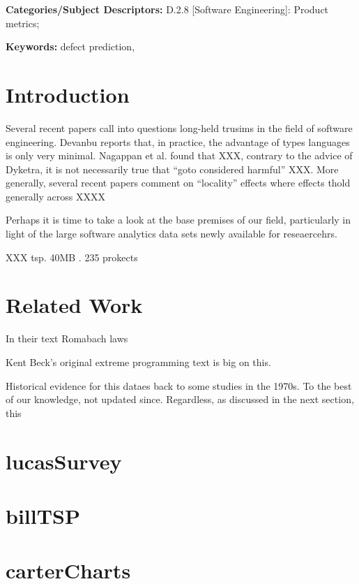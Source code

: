 \documentclass{sig-alternate}
\begin{document}
\vspace{1mm}
\noindent
{\bf Categories/Subject Descriptors:} 
D.2.8 [Software Engineering]: Product metrics; 

 

\vspace{1mm}
\noindent
{\bf Keywords:} defect prediction, 

\section{Introduction}
Several recent papers call into questions long-held trusims in the field
of software engineering. Devanbu reports that, in practice, the advantage of types languages
is only very minimal. Nagappan et al. found that XXX, contrary to the advice of Dyketra,
it is not necessarily true that ``goto considered harmful'' XXX. More generally,
several recent  papers comment on ``locality'' effects where effects
thold  generally across XXXX
 
Perhaps it is time to take a look at the base premises of our field, particularly in light of the large software analytics data sets newly available for reseaercehrs.

XXX tsp. 40MB . 235 prokects

\section{Related Work}

In their text Romabach laws

Kent Beck's original extreme programming text is big on this.

Historical  evidence for this dataes back to some studies in the 1970s. To the best of
our knowledge, not updated since. Regardless, as discussed in the next section, this



\section{lucasSurvey}




\section{billTSP}

\section{carterCharts}
\end{document}
